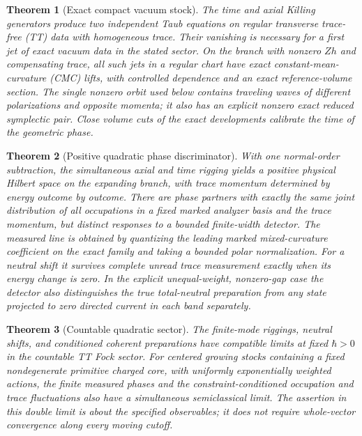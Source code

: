 \documentclass[11pt]{article}
\newtheorem{theorem}{Theorem}
\theoremstyle{remark}
\newcommand{\hc}{\hbar}
\begin{document}
\begin{theorem}[Exact compact vacuum stock]\label{thm:exact}
The time and axial Killing generators produce two independent Taub equations on regular transverse trace-free (TT) data with homogeneous trace. Their vanishing is necessary for a first jet of exact vacuum data in the stated sector. On the branch with nonzero \(Zh\) and compensating trace, all such jets in a regular chart have exact constant-mean-curvature (CMC) lifts, with controlled dependence and an exact reference-volume section. The single nonzero orbit used below contains traveling waves of different polarizations and opposite momenta; it also has an explicit nonzero exact reduced symplectic pair. Close volume cuts of the exact developments calibrate the time of the geometric phase.
\end{theorem}

\begin{theorem}[Positive quadratic phase discriminator]\label{thm:phase}
With one normal-order subtraction, the simultaneous axial and time rigging yields a positive physical Hilbert space on the expanding branch, with trace momentum determined by energy outcome by outcome. There are phase partners with exactly the same joint distribution of \emph{all} occupations in a fixed marked analyzer basis and the trace momentum, but distinct responses to a bounded finite-width detector. The measured line is obtained by quantizing the leading marked mixed-curvature coefficient on the exact family and taking a bounded polar normalization. For a neutral shift it survives complete unread trace measurement exactly when its energy change is zero. In the explicit unequal-weight, nonzero-gap case the detector also distinguishes the true total-neutral preparation from any state projected to zero directed current in each band separately.
\end{theorem}

\begin{theorem}[Countable quadratic sector]\label{thm:countable}
The finite-mode riggings, neutral shifts, and conditioned coherent preparations have compatible limits at fixed \(\hc>0\) in the countable TT Fock sector. For centered growing stocks containing a fixed nondegenerate primitive charged core, with uniformly exponentially weighted actions, the finite measured phases and the constraint-conditioned occupation and trace fluctuations also have a simultaneous semiclassical limit. The assertion in this double limit is about the specified observables; it does not require whole-vector convergence along every moving cutoff.
\end{theorem}
\end{document}
